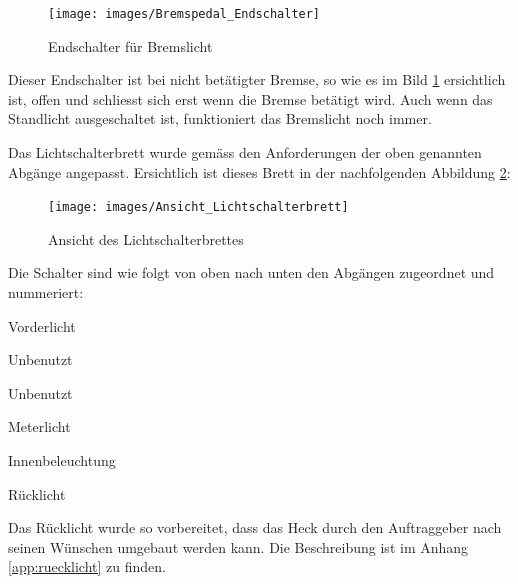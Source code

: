 \begin{itemize}
\begin{figure}[h!]
	\centering
		\texttt{[image: images/Bremspedal\_Endschalter]}
	\caption{Endschalter für Bremslicht}
	\label{fig:EndschalterBremslicht}
\end{figure}

Dieser Endschalter ist bei nicht betätigter Bremse, so wie es im Bild \ref{fig:EndschalterBremslicht} ersichtlich ist, offen und schliesst sich erst wenn die Bremse betätigt wird. Auch wenn das Standlicht ausgeschaltet ist, funktioniert das Bremslicht noch immer.

\end{itemize}

\newpage

Das Lichtschalterbrett wurde  gemäss den Anforderungen der oben genannten Abgänge angepasst. Ersichtlich ist dieses Brett in der nachfolgenden Abbildung \ref{fig:AnsichtLichtschalterbrett}:

\begin{figure}[h!]
	\centering
		\texttt{[image: images/Ansicht\_Lichtschalterbrett]}
	\caption{Ansicht des Lichtschalterbrettes}
	\label{fig:AnsichtLichtschalterbrett}
\end{figure}

Die Schalter sind wie folgt von oben nach unten den Abgängen zugeordnet und nummeriert:

\begin{compactenum}
\item Vorderlicht
\item Unbenutzt
\item Unbenutzt
\item Meterlicht
\item Innenbeleuchtung
\item Rücklicht
\end{compactenum}

Das Rücklicht wurde so vorbereitet, dass das Heck durch den Auftraggeber nach seinen Wünschen umgebaut werden kann. Die Beschreibung ist im Anhang \ref{app:ruecklicht} zu finden.

\color{black}
\newpage
